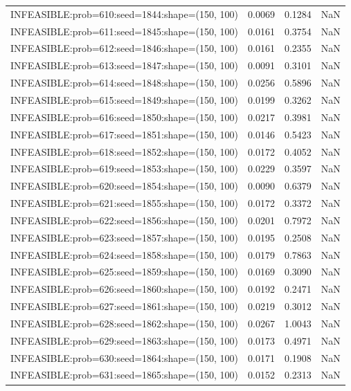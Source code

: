\begin{longtable}{lccc}
INFEASIBLE:prob=610:seed=1844:shape=(150, 100) &   0.0069 &  0.1284 &    NaN \\
INFEASIBLE:prob=611:seed=1845:shape=(150, 100) &   0.0161 &  0.3754 &    NaN \\
INFEASIBLE:prob=612:seed=1846:shape=(150, 100) &   0.0161 &  0.2355 &    NaN \\
INFEASIBLE:prob=613:seed=1847:shape=(150, 100) &   0.0091 &  0.3101 &    NaN \\
INFEASIBLE:prob=614:seed=1848:shape=(150, 100) &   0.0256 &  0.5896 &    NaN \\
INFEASIBLE:prob=615:seed=1849:shape=(150, 100) &   0.0199 &  0.3262 &    NaN \\
INFEASIBLE:prob=616:seed=1850:shape=(150, 100) &   0.0217 &  0.3981 &    NaN \\
INFEASIBLE:prob=617:seed=1851:shape=(150, 100) &   0.0146 &  0.5423 &    NaN \\
INFEASIBLE:prob=618:seed=1852:shape=(150, 100) &   0.0172 &  0.4052 &    NaN \\
INFEASIBLE:prob=619:seed=1853:shape=(150, 100) &   0.0229 &  0.3597 &    NaN \\
INFEASIBLE:prob=620:seed=1854:shape=(150, 100) &   0.0090 &  0.6379 &    NaN \\
INFEASIBLE:prob=621:seed=1855:shape=(150, 100) &   0.0172 &  0.3372 &    NaN \\
INFEASIBLE:prob=622:seed=1856:shape=(150, 100) &   0.0201 &  0.7972 &    NaN \\
INFEASIBLE:prob=623:seed=1857:shape=(150, 100) &   0.0195 &  0.2508 &    NaN \\
INFEASIBLE:prob=624:seed=1858:shape=(150, 100) &   0.0179 &  0.7863 &    NaN \\
INFEASIBLE:prob=625:seed=1859:shape=(150, 100) &   0.0169 &  0.3090 &    NaN \\
INFEASIBLE:prob=626:seed=1860:shape=(150, 100) &   0.0192 &  0.2471 &    NaN \\
INFEASIBLE:prob=627:seed=1861:shape=(150, 100) &   0.0219 &  0.3012 &    NaN \\
INFEASIBLE:prob=628:seed=1862:shape=(150, 100) &   0.0267 &  1.0043 &    NaN \\
INFEASIBLE:prob=629:seed=1863:shape=(150, 100) &   0.0173 &  0.4971 &    NaN \\
INFEASIBLE:prob=630:seed=1864:shape=(150, 100) &   0.0171 &  0.1908 &    NaN \\
INFEASIBLE:prob=631:seed=1865:shape=(150, 100) &   0.0152 &  0.2313 &    NaN \\

\end{longtable}
